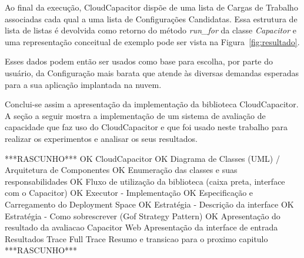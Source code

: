 Ao final da execução, CloudCapacitor dispõe de uma lista de Cargas de Trabalho 
associadas cada qual a uma lista de Configurações Candidatas. Essa estrutura de
lista de listas é devolvida como retorno do método \emph{run\_for} da classe 
\emph{Capacitor} e uma representação conceitual de exemplo pode ser vista na 
Figura~\ref{fig:resultado}. 

Esses dados podem então ser usados como base para escolha, por parte do usuário,
da Configuração mais barata que atende às diversas demandas esperadas para a 
sua aplicação implantada na nuvem.

Conclui-se assim a apresentação da implementação da biblioteca CloudCapacitor. A
seção a seguir mostra a implementação de um sistema de avaliação de capacidade 
que faz uso do CloudCapacitor e que foi usado neste trabalho para realizar os
experimentos e analisar os seus resultados.

***RASCUNHO***
OK CloudCapacitor
OK   Diagrama de Classes (UML) / Arquitetura de Componentes
OK   Enumeração das classes e suas responsabilidades
OK   Fluxo de utilização da biblioteca (caixa preta, interface com o Capacitor)
OK   Executor - Implementação
OK   Especificação e Carregamento do Deployment Space
OK   Estratégia - Descrição da interface
OK   Estratégia - Como sobrescrever (Gof Strategy Pattern)
OK   Apresentação do resultado da avaliacao
Capacitor Web
  Apresentação da interface de entrada
  Resultados
  Trace
  Full Trace
Resumo e transicao para o proximo capitulo
***RASCUNHO***

 
